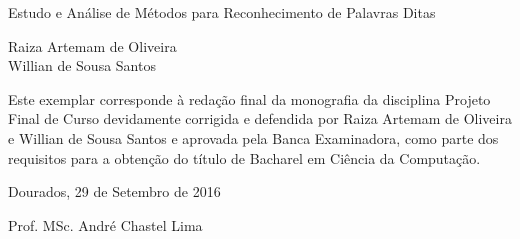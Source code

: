 \thispagestyle{empty}
\begin{center}

\Large{Estudo e Análise de Métodos para Reconhecimento de Palavras Ditas}

\vspace*{4cm}

\large{Raiza Artemam de Oliveira \\ Willian de Sousa Santos }

\vspace*{4cm}

\end{center}
\begin{flushright}
\begin{minipage}{0.5\textwidth}
\normalsize{
Este exemplar corresponde à redação final
da monografia da disciplina Projeto Final de Curso 
devidamente corrigida e defendida por
 Raiza Artemam de Oliveira e Willian de Sousa Santos
e aprovada pela Banca Examinadora, 
como parte dos requisitos para a obtenção
do título de Bacharel em Ciência da Computação.

\vspace*{2cm}

Dourados, 29 de Setembro de 2016

\vspace*{2cm}

Prof. MSc. André Chastel Lima
}
\end{minipage}
\end{flushright}



